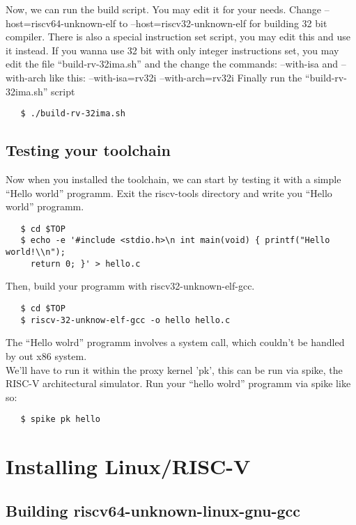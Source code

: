 Now, we can run the build script. You may edit it for your needs. Change --host=riscv64-unknown-elf to --host=riscv32-unknown-elf for building 32 bit compiler.
There is also a special instruction set script, you may edit this and use it instead.
If you wanna use 32 bit with only integer instructions set, you may edit the file ``build-rv-32ima.sh'' and the change the commands: --with-isa and --with-arch like this: --with-isa=rv32i --with-arch=rv32i
Finally run the ``build-rv-32ima.sh'' script
\begin{verbatim}
   $ ./build-rv-32ima.sh
\end{verbatim}

\subsection{Testing your toolchain}

Now when you installed the toolchain, we can start by testing it with a simple ``Hello world'' programm.
Exit the riscv-tools directory and write you ``Hello world'' programm.

\begin{verbatim}
   $ cd $TOP
   $ echo -e '#include <stdio.h>\n int main(void) { printf("Hello world!\\n");
     return 0; }' > hello.c
\end{verbatim}

\newpage

Then, build your programm with riscv32-unknown-elf-gcc.

\begin{verbatim}
   $ cd $TOP
   $ riscv-32-unknow-elf-gcc -o hello hello.c
\end{verbatim}

The ``Hello wolrd'' programm involves a system call, which couldn't be handled by out x86 system. \\We'll have to run it within the proxy kernel 'pk', this can be run via spike, the RISC-V architectural simulator. Run your ``hello wolrd'' programm via spike like so:

\begin{verbatim}
   $ spike pk hello
\end{verbatim}

\section{Installing Linux/RISC-V}

\subsection{Building riscv64-unknown-linux-gnu-gcc}

